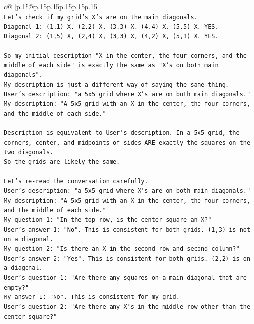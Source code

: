\documentclass{article}
\begin{document}
{\begin{supertabular}{c@{$\;$}|p{.15\linewidth}@{}p{.15\linewidth}p{.15\linewidth}p{.15\linewidth}p{.15\linewidth}p{.15\linewidth}}
{{{\\ 
\texttt{Let's check if my grid's X's are on the main diagonals.} \\
\texttt{Diagonal 1: (1,1) X, (2,2) X, (3,3) X, (4,4) X, (5,5) X. YES.} \\
\texttt{Diagonal 2: (1,5) X, (2,4) X, (3,3) X, (4,2) X, (5,1) X. YES.} \\
\\ 
\texttt{So my initial description "X in the center, the four corners, and the middle of each side" is exactly the same as "X's on both main diagonals".} \\
\texttt{My description is just a different way of saying the same thing.} \\
\texttt{User's description: "a 5x5 grid where X's are on both main diagonals."} \\
\texttt{My description: "A 5x5 grid with an X in the center, the four corners, and the middle of each side."} \\
\\ 
\texttt{Description is equivalent to User's description. In a 5x5 grid, the corners, center, and midpoints of sides ARE exactly the squares on the two diagonals.} \\
\texttt{So the grids are likely the same.} \\
\\ 
\texttt{Let's re{-}read the conversation carefully.} \\
\texttt{User's description: "a 5x5 grid where X's are on both main diagonals."} \\
\texttt{My description: "A 5x5 grid with an X in the center, the four corners, and the middle of each side."} \\
\texttt{My question 1: "In the top row, is the center square an X?"} \\
\texttt{User's answer 1: "No". This is consistent for both grids. (1,3) is not on a diagonal.} \\
\texttt{My question 2: "Is there an X in the second row and second column?"} \\
\texttt{User's answer 2: "Yes". This is consistent for both grids. (2,2) is on a diagonal.} \\
\texttt{User's question 1: "Are there any squares on a main diagonal that are empty?"} \\
\texttt{My answer 1: "No". This is consistent for my grid.} \\
\texttt{User's question 2: "Are there any X's in the middle row other than the center square?"} \\
}}}
\end{supertabular}}
\end{document}
